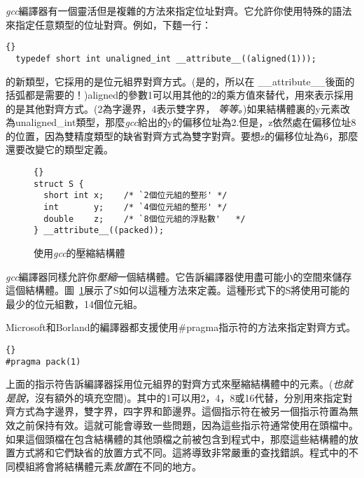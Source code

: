 
\emph{gcc}編譯器有一個靈活但是複雜的方法來指定位址對齊。它允許你使用特殊的語法來指定任意類型的位址對齊。例如，下麵一行：
\begin{lstlisting}[stepnumber=0]{}
  typedef short int unaligned_int __attribute__((aligned(1)));
\end{lstlisting}
的新類型，它採用的是位元組界對齊方式。(是的，所以在{\code
\_\_attribute\_\_}後面的括弧都是需要的！){\code aligned}的參數1可以用其他的2的乘方值來替代，用來表示採用的是其他對齊方式。(2為字邊界，4表示雙字界，
\emph{等等。})如果結構體裏的{\code y}元素改為{\code unaligned\_int}類型，那麼\emph{gcc}給出的{\code y}的偏移位址為2.但是，{\code z}依然處在偏移位址8的位置，因為雙精度類型的缺省對齊方式為雙字對齊。要想{\code z}的偏移位址為6，那麼還要改變它的類型定義。

\begin{figure}[t]
\lstset{escapeinside=`',language=Pascal,%
}
\begin{lstlisting}[frame=tlrb,stepnumber=0]{}
struct S {
  short int x;    /* `2個位元組的整形' */
  int       y;    /* `4個位元組的整形' */
  double    z;    /* `8個位元組的浮點數'   */
} __attribute__((packed));
\end{lstlisting}
\caption{使用\emph{gcc}的壓縮結構體 \label{fig:packedStruct}}
\end{figure}

\emph{gcc}編譯器同樣允許你\emph{壓縮}一個結構體。它告訴編譯器使用盡可能小的空間來儲存這個結構體。圖~\ref{fig:packedStruct}展示了{\code S}如何以這種方法來定義。這種形式下的{\code S}將使用可能的最少的位元組數，14個位元組。

Microsoft和Borland的編譯器都支援使用{\code \#pragma}指示符的方法來指定對齊方式。
\begin{lstlisting}[stepnumber=0]{}
#pragma pack(1)
\end{lstlisting}
上面的指示符告訴編譯器採用位元組界的對齊方式來壓縮結構體中的元素。(\emph{也就是說}，沒有額外的填充空間)。其中的1可以用2，4，8或16代替，分別用來指定對齊方式為字邊界，雙字界，四字界和節邊界。這個指示符在被另一個指示符置為無效之前保持有效。這就可能會導致一些問題，因為這些指示符通常使用在頭檔中。如果這個頭檔在包含結構體的其他頭檔之前被包含到程式中，那麼這些結構體的放置方式將和它們缺省的放置方式不同。這將導致非常嚴重的查找錯誤。程式中的不同模組將會將結構體元素\emph{放置}在不同的地方。

